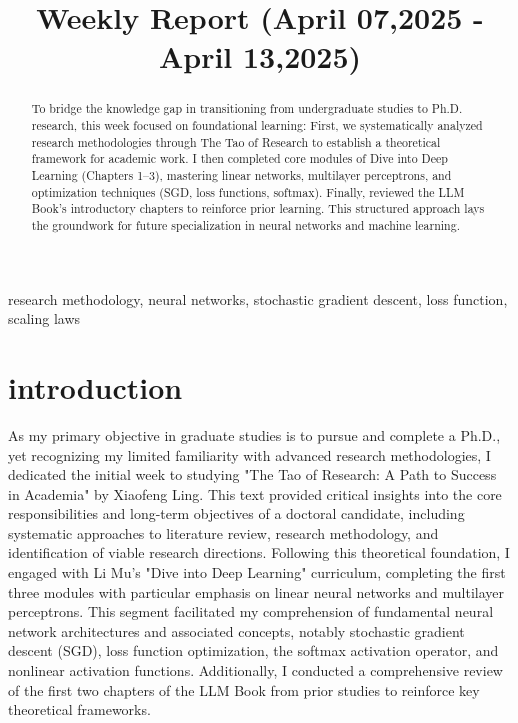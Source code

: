 \documentclass[conference]{IEEEtran}
\title{Weekly Report (April 07,2025 - April 13,2025)}
\author{\IEEEauthorblockN{1\textsuperscript{st}Xiaosong Yuan}
\IEEEauthorblockA{\textit{AISIG}\\
\textit{ShangHaiJiaoTong University}\\ShangHai,China\\yuanxiaosong1999@gmail.com}}
\begin{document}
\maketitle


\begin{abstract}
To bridge the knowledge gap in transitioning from undergraduate studies to Ph.D. research, this week focused on foundational learning: First,  we systematically analyzed research methodologies through The Tao of Research to establish a theoretical framework for academic work. I then completed core modules of Dive into Deep Learning (Chapters 1–3), mastering linear networks, multilayer perceptrons, and optimization techniques (SGD, loss functions, softmax). Finally, reviewed the LLM Book’s introductory chapters to reinforce prior learning. This structured approach lays the groundwork for future specialization in neural networks and machine learning.
\end{abstract}

\begin{IEEEkeywords}
research methodology, neural networks, stochastic gradient descent, loss function, scaling laws
\end {IEEEkeywords}

\section{introduction}
As my primary objective in graduate studies is to pursue and complete a Ph.D., yet recognizing my limited familiarity with advanced research methodologies, I dedicated the initial week to studying "The Tao of Research: A Path to Success in Academia" by Xiaofeng Ling. This text provided critical insights into the core responsibilities and long-term objectives of a doctoral candidate, including systematic approaches to literature review, research methodology, and identification of viable research directions. Following this theoretical foundation, I engaged with Li Mu's "Dive into Deep Learning" curriculum, completing the first three modules with particular emphasis on linear neural networks and multilayer perceptrons. This segment facilitated my comprehension of fundamental neural network architectures and associated concepts, notably stochastic gradient descent (SGD), loss function optimization, the softmax activation operator, and nonlinear activation functions. Additionally, I conducted a comprehensive review of the first two chapters of the LLM Book from prior studies to reinforce key theoretical frameworks.
\end{document}
